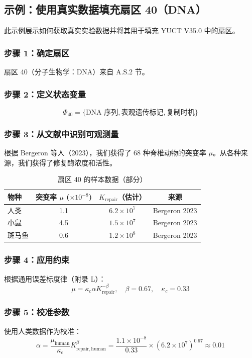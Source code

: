 \documentclass[11pt,a4paper]{article}
\begin{document}
	\subsection*{示例：使用真实数据填充扇区 40（DNA）}
	
	此示例展示如何获取真实实验数据并将其用于填充 YUCT V35.0 中的扇区。
	
	\subsubsection*{步骤 1：确定扇区}
	扇区 40（分子生物学：DNA）来自 A.S.2 节。
	
	\subsubsection*{步骤 2：定义状态变量}
	\[
	\Phi_{40} = \{ \text{DNA 序列}, \text{表观遗传标记}, \text{复制时机} \}
	\]
	
	\subsubsection*{步骤 3：从文献中识别可观测量}
	根据 Bergeron 等人（2023），我们获得了 68 种脊椎动物的突变率 \(\mu\)。从各种来源，我们获得了修复酶浓度和活性。
	
	\begin{table}[htbp]
		\centering
		\caption{扇区 40 的样本数据（部分）}
		\begin{tabular}{lccc}
			\toprule
			\textbf{物种} & \textbf{突变率 \(\mu\) (\(\times 10^{-8}\))} & \textbf{\(K_{\mathrm{repair}}\)（估计）} & \textbf{来源} \\
			\midrule
			人类 & 1.1 & \(6.2 \times 10^7\) & Bergeron 2023 \\
			小鼠 & 4.5 & \(1.5 \times 10^7\) & Bergeron 2023 \\
			斑马鱼 & 0.6 & \(1.2 \times 10^8\) & Bergeron 2023 \\
			\bottomrule
		\end{tabular}
	\end{table}
	
	\subsubsection*{步骤 4：应用约束}
	根据通用误差标度律（附录 L）：
	\[
	\mu = \kappa_c \alpha K_{\mathrm{repair}}^{-\beta}, \quad \beta = 0.67, \quad \kappa_c = 0.33
	\]
	
	\subsubsection*{步骤 5：校准参数}
	使用人类数据作为校准：
	\[
	\alpha = \frac{\mu_{\mathrm{human}}}{\kappa_c} K_{\mathrm{repair,human}}^{\beta} = \frac{1.1\times 10^{-8}}{0.33} \times (6.2\times 10^7)^{0.67} \approx 0.01
	\]
	
\end{document}

